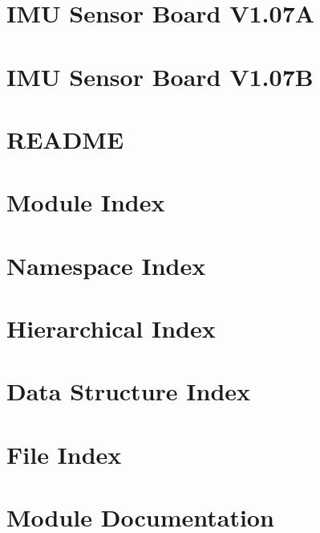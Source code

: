 \let\mypdfximage\pdfximage\def\pdfximage{\immediate\mypdfximage}\documentclass[twoside]{book}
\newcommand{\+}{\discretionary{\mbox{\scriptsize$\hookleftarrow$}}{}{}}
\begin{document}
\chapter{I\+MU Sensor Board V1.07A}
\label{md__d_1_cloned_repo_trainawear_train-_a-wear__hardware__sensor-_board__v107_a__r_e_a_d_m_e}

\chapter{I\+MU Sensor Board V1.07B}
\label{md__d_1_cloned_repo_trainawear_train-_a-wear__hardware__sensor-_board__v107_b__r_e_a_d_m_e}

\chapter{R\+E\+A\+D\+ME}
\label{md__d_1_cloned_repo_trainawear_train-_a-wear__r_e_a_d_m_e}

\chapter{Module Index}

\chapter{Namespace Index}

\chapter{Hierarchical Index}

\chapter{Data Structure Index}

\chapter{File Index}

\chapter{Module Documentation}


\end{document}
